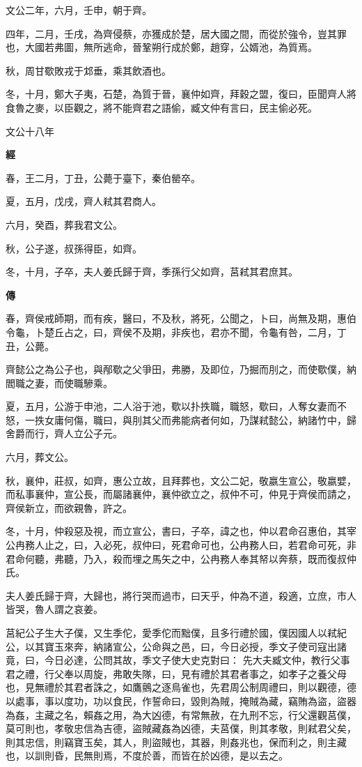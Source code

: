 \documentclass{ctexart}
\begin{document}
文公二年，六月，壬申，朝于齊。

四年，二月，壬戌，為齊侵蔡，亦獲成於楚，居大國之間，而從於強令，豈其罪也，大國若弗圖，無所逃命，晉鞏朔行成於鄭，趙穿，公婿池，為質焉。

秋，周甘歜敗戎于邥垂，乘其飲酒也。

冬，十月，鄭大子夷，石楚，為質于晉，襄仲如齊，拜穀之盟，復曰，臣聞齊人將食魯之麥，以臣觀之，將不能齊君之語偷，臧文仲有言曰，民主偷必死。





文公十八年


\textbf{經}



春，王二月，丁丑，公薨于臺下，秦伯罃卒。

夏，五月，戊戌，齊人弒其君商人。

六月，癸酉，葬我君文公。

秋，公子遂，叔孫得臣，如齊。

冬，十月，子卒，夫人姜氏歸于齊，季孫行父如齊，莒弒其君庶其。

\textbf{傳}



春，齊侯戒師期，而有疾，醫曰，不及秋，將死，公聞之，卜曰，尚無及期，惠伯令龜，卜楚丘占之，曰，齊侯不及期，非疾也，君亦不聞，令龜有咎，二月，丁丑，公薨。

齊懿公之為公子也，與邴歜之父爭田，弗勝，及即位，乃掘而刖之，而使歜僕，納閻職之妻，而使職驂乘。

夏，五月，公游于申池，二人浴于池，歜以扑抶職，職怒，歜曰，人奪女妻而不怒，一抶女庸何傷，職曰，與刖其父而弗能病者何如，乃謀弒懿公，納諸竹中，歸舍爵而行，齊人立公子元。

六月，葬文公。

秋，襄仲，莊叔，如齊，惠公立故，且拜葬也，文公二妃，敬嬴生宣公，敬嬴嬖，而私事襄仲，宣公長，而屬諸襄仲，襄仲欲立之，叔仲不可，仲見于齊侯而請之，齊侯新立，而欲親魯，許之。

冬，十月，仲殺惡及視，而立宣公，書曰，子卒，諱之也，仲以君命召惠伯，其宰公冉務人止之，曰，入必死，叔仲曰，死君命可也，公冉務人曰，若君命可死，非君命何聽，弗聽，乃入，殺而埋之馬矢之中，公冉務人奉其帑以奔蔡，既而復叔仲氏。

夫人姜氏歸于齊，大歸也，將行哭而過市，曰天乎，仲為不道，殺適，立庶，市人皆哭，魯人謂之哀姜。

莒紀公子生大子僕，又生季佗，愛季佗而黜僕，且多行禮於國，僕因國人以弒紀公，以其寶玉來奔，納諸宣公，公命與之邑，曰，今日必授，季文子使司寇出諸竟，曰，今日必達，公問其故，季文子使大史克對曰：
先大夫臧文仲，教行父事君之禮，行父奉以周旋，弗敢失隊，曰，見有禮於其君者事之，如孝子之養父母也，見無禮於其君者誅之，如鷹鸇之逐鳥雀也，先君周公制周禮曰，則以觀德，德以處事，事以度功，功以食民，作誓命曰，毀則為賊，掩賊為藏，竊賄為盜，盜器為姦，主藏之名，賴姦之用，為大凶德，有常無赦，在九刑不忘，行父還觀莒僕，莫可則也，孝敬忠信為吉德，盜賊藏姦為凶德，夫莒僕，則其孝敬，則弒君父矣，則其忠信，則竊寶玉矣，其人，則盜賊也，其器，則姦兆也，保而利之，則主藏也，以訓則昏，民無則焉，不度於善，而皆在於凶德，是以去之。
\end{document}
